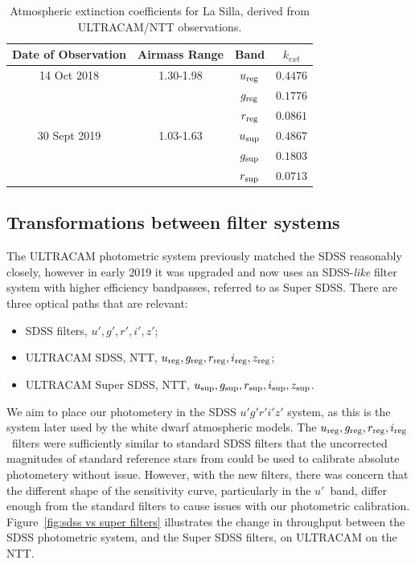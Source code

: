 \begin{table}
    \centering
    \caption{Atmospheric extinction coefficients for La Silla, derived from ULTRACAM/NTT observations.}
    \label{table:atmos_extinction}
    \begin{tabular}{cccc}
        \hline
        Date of Observation & Airmass Range & Band & $k_{ext}$ \\
        \hline
        \hline
        14 Oct 2018   & 1.30-1.98 & $u_{\rm reg}$ & $0.4476$ \\
                      &           & $g_{\rm reg}$ & $0.1776$ \\
                      &           & $r_{\rm reg}$ & $0.0861$ \\
        \hline
        30 Sept 2019  & 1.03-1.63 & $u_{\rm sup}$ & $0.4867$ \\
                      &           & $g_{\rm sup}$ & $0.1803$ \\
                      &           & $r_{\rm sup}$ & $0.0713$ \\
        \hline
    \end{tabular}
\end{table}


\subsection{Transformations between filter systems}
\label{sect:colour correction method}

The ULTRACAM photometric system previously matched the SDSS reasonably closely, however in early 2019 it was upgraded and now uses an SDSS-\emph{like} filter system with higher efficiency bandpasses, referred to as Super SDSS. There are three optical paths that are relevant:
\begin{itemize}
\item SDSS filters, $u', g', r', i', z'$;
\item ULTRACAM SDSS, NTT, $u_{\rm reg}, g_{\rm reg}, r_{\rm reg}, i_{\rm reg}, z_{\rm reg}$;
\item ULTRACAM Super SDSS,  NTT, $u_{\rm sup}, g_{\rm sup}, r_{\rm sup}, i_{\rm sup}, z_{\rm sup}$.
\end{itemize}

We aim to place our photometery in the SDSS $u'g'r'i'z'$ system, as this is the system later used by the white dwarf atmospheric models. The $u_{\rm reg}, g_{\rm reg}, r_{\rm reg}, i_{\rm reg}$\ filters were sufficiently similar to standard SDSS filters that the uncorrected magnitudes of standard reference stars from \citet{smith2002} could be used to calibrate absolute photometery without issue. However, with the new filters, there was concern that the different shape of the sensitivity curve, particularly in the $u'$\ band, differ enough from the standard filters to cause issues with our photometric calibration. Figure~\ref{fig:sdss vs super filters} illustrates the change in throughput between the SDSS photometric system, and the Super SDSS filters, on ULTRACAM on the NTT. 

